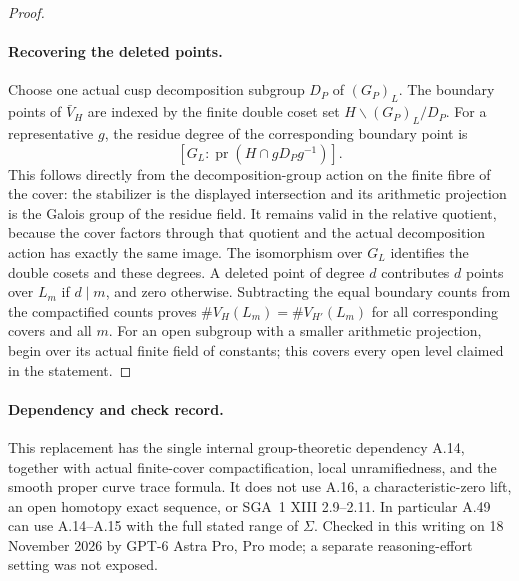 \begin{proof}
\paragraph{Recovering the deleted points.}
Choose one actual cusp decomposition subgroup $D_P$ of $(G_P)_L$.
The boundary points of $\bar V_H$ are indexed by the finite double
coset set $H\backslash(G_P)_L/D_P$. For a representative $g$, the
residue degree of the corresponding boundary point is
\[
       [G_L:\operatorname{pr}(H\cap gD_Pg^{-1})].
\]
This follows directly from the decomposition-group action on the
finite fibre of the cover: the stabilizer is the displayed
intersection and its arithmetic projection is the Galois group
of the residue field. It remains valid in the relative quotient,
because the cover factors through that quotient and the actual
decomposition action has exactly the same image. The isomorphism
over $G_L$ identifies the double cosets and these degrees.
A deleted point of degree $d$ contributes $d$ points over $L_m$
if $d\mid m$, and zero otherwise. Subtracting the equal boundary
counts from the compactified counts proves
$\#V_H(L_m)=\#V_{H'}(L_m)$ for all corresponding covers and all $m$.
For an open subgroup with a smaller arithmetic projection, begin
over its actual finite field of constants; this covers every open
level claimed in the statement.
\end{proof}

\paragraph{Dependency and check record.}
This replacement has the single internal group-theoretic dependency
A.14, together with actual finite-cover compactification, local
unramifiedness, and the smooth proper curve trace formula. It does
not use A.16, a characteristic-zero lift, an open homotopy exact
sequence, or SGA~1 XIII 2.9--2.11. In particular A.49 can use
A.14--A.15 with the full stated range of $\Sigma$. Checked in this
writing on 18 November 2026 by GPT-6 Astra Pro, Pro mode; a separate
reasoning-effort setting was not exposed.
